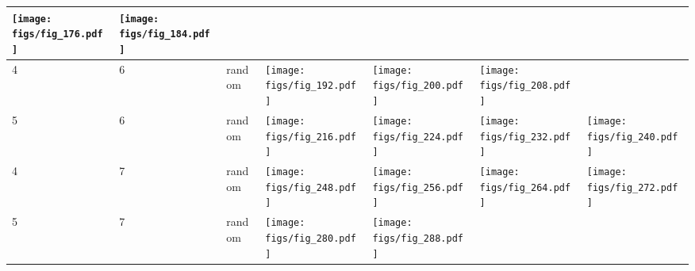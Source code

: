 \documentclass[oneside,canadian,landscape]{article}
\begin{document}
\begin{center}
\begin{longtable}{|l|l|l||l|l|l|l|}
\begin{minipage}{3.5cm}
\texttt{[image: figs/fig\_176.pdf]}
\end{minipage}
&\begin{minipage}{3.5cm}
\texttt{[image: figs/fig\_184.pdf]}
\end{minipage}
&\\ \hline
4&6&random&\begin{minipage}{3.5cm}
\texttt{[image: figs/fig\_192.pdf]}
\end{minipage}
&\begin{minipage}{3.5cm}
\texttt{[image: figs/fig\_200.pdf]}
\end{minipage}
&\begin{minipage}{3.5cm}
\texttt{[image: figs/fig\_208.pdf]}
\end{minipage}
&\\ \hline
5&6&random&\begin{minipage}{3.5cm}
\texttt{[image: figs/fig\_216.pdf]}
\end{minipage}
&\begin{minipage}{3.5cm}
\texttt{[image: figs/fig\_224.pdf]}
\end{minipage}
&\begin{minipage}{3.5cm}
\texttt{[image: figs/fig\_232.pdf]}
\end{minipage}
&\begin{minipage}{3.5cm}
\texttt{[image: figs/fig\_240.pdf]}
\end{minipage}
\\ \hline
4&7&random&\begin{minipage}{3.5cm}
\texttt{[image: figs/fig\_248.pdf]}
\end{minipage}
&\begin{minipage}{3.5cm}
\texttt{[image: figs/fig\_256.pdf]}
\end{minipage}
&\begin{minipage}{3.5cm}
\texttt{[image: figs/fig\_264.pdf]}
\end{minipage}
&\begin{minipage}{3.5cm}
\texttt{[image: figs/fig\_272.pdf]}
\end{minipage}
\\ \hline
5&7&random&\begin{minipage}{3.5cm}
\texttt{[image: figs/fig\_280.pdf]}
\end{minipage}
&\begin{minipage}{3.5cm}
\texttt{[image: figs/fig\_288.pdf]}

\end{minipage}
\end{longtable}
\end{center}
\end{document}
